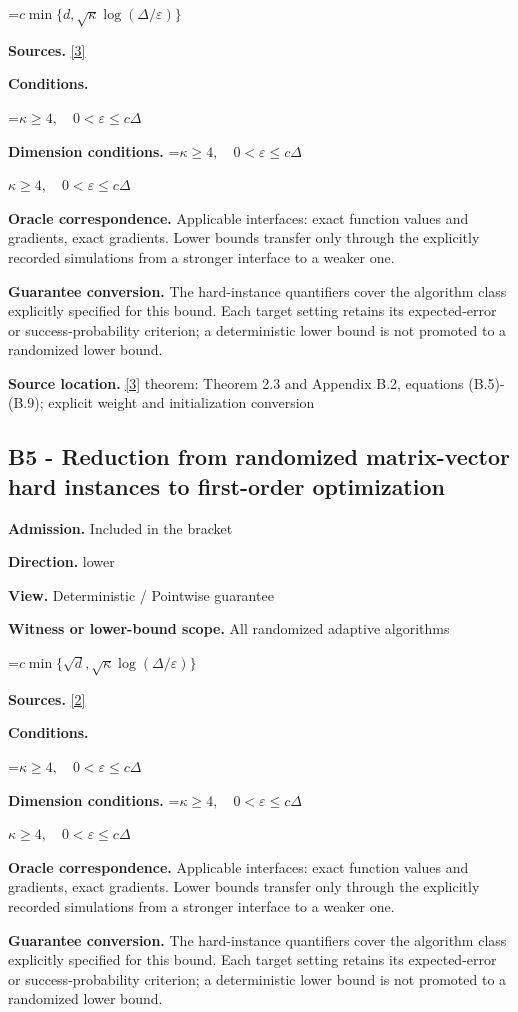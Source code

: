 \documentclass[10pt,a4paper]{article}
\newcommand{\AtlasMath}[1]{\par\begingroup\centering\setbox0=\hbox{$\displaystyle #1$}\ifdim\wd0>1.4\linewidth\typeout{ATLAS WIDE FORMULA: \the\wd0}\fi\ifdim\wd0>\linewidth\resizebox{\linewidth}{!}{\box0}\else\box0\fi\par\endgroup}
\newcommand{\AtlasInlineMath}[1]{\begingroup\setbox0=\hbox{$#1$}\ifdim\wd0>.4\linewidth\endgroup\AtlasMath{#1}\else\endgroup$#1$\fi}
\begin{document}
\AtlasMath{c\min\{d,\sqrt\kappa\log(\Delta/\varepsilon)\}}
\textbf{Sources.} \href{https://arxiv.org/pdf/2609.33360v2}{[3]}

\textbf{Conditions.} 
\AtlasMath{\kappa\ge4,\quad0<\varepsilon\le c\Delta}


\textbf{Dimension conditions.} \AtlasInlineMath{\kappa\ge4,\quad0<\varepsilon\le c\Delta}

\textbf{Oracle correspondence.} Applicable interfaces: exact function values and gradients, exact gradients. Lower bounds transfer only through the explicitly recorded simulations from a stronger interface to a weaker one.

\textbf{Guarantee conversion.} The hard-instance quantifiers cover the algorithm class explicitly specified for this bound. Each target setting retains its expected-error or success-probability criterion; a deterministic lower bound is not promoted to a randomized lower bound.

\textbf{Source location.} \href{https://arxiv.org/pdf/2609.33360v2}{[3]} theorem: Theorem 2.3 and Appendix B.2, equations (B.5)-(B.9); explicit weight and initialization conversion

\subsection{B5 - Reduction from randomized matrix-vector hard instances to first-order optimization}
\textbf{Admission.} Included in the bracket

\textbf{Direction.} lower

\textbf{View.} Deterministic / Pointwise guarantee

\textbf{Witness or lower-bound scope.} All randomized adaptive algorithms

\AtlasMath{c\min\{\sqrt d,\sqrt\kappa\log(\Delta/\varepsilon)\}}
\textbf{Sources.} \href{https://arxiv.org/pdf/2609.10874}{[2]}

\textbf{Conditions.} 
\AtlasMath{\kappa\ge4,\quad0<\varepsilon\le c\Delta}


\textbf{Dimension conditions.} \AtlasInlineMath{\kappa\ge4,\quad0<\varepsilon\le c\Delta}

\textbf{Oracle correspondence.} Applicable interfaces: exact function values and gradients, exact gradients. Lower bounds transfer only through the explicitly recorded simulations from a stronger interface to a weaker one.

\textbf{Guarantee conversion.} The hard-instance quantifiers cover the algorithm class explicitly specified for this bound. Each target setting retains its expected-error or success-probability criterion; a deterministic lower bound is not promoted to a randomized lower bound.
\end{document}
